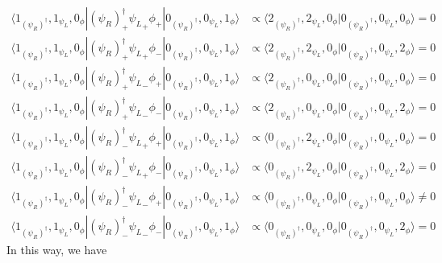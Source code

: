 \begin{align*}
 \langle1_{(\psi_R)^{\dagger}},1_{{\psi_L}},0_{\phi}|(\psi_R)^{\dagger}_{+}{\psi_L}_{+}\phi_{+}|0_{(\psi_R)^{\dagger}},0_{{\psi_L}},1_{\phi}\rangle  &\propto  \langle2_{(\psi_R)^{\dagger}},2_{{\psi_L}},0_{\phi}|0_{(\psi_R)^{\dagger}},0_{{\psi_L}},0_{\phi}\rangle =0\\ 
 \langle1_{(\psi_R)^{\dagger}},1_{{\psi_L}},0_{\phi}|(\psi_R)^{\dagger}_{+}{\psi_L}_{+}\phi_{-}|0_{(\psi_R)^{\dagger}},0_{{\psi_L}},1_{\phi}\rangle  &\propto  \langle2_{(\psi_R)^{\dagger}},2_{{\psi_L}},0_{\phi}|0_{(\psi_R)^{\dagger}},0_{{\psi_L}},2_{\phi}\rangle =0\\ 
 \langle1_{(\psi_R)^{\dagger}},1_{{\psi_L}},0_{\phi}|(\psi_R)^{\dagger}_{+}{\psi_L}_{-}\phi_{+}|0_{(\psi_R)^{\dagger}},0_{{\psi_L}},1_{\phi}\rangle  &\propto  \langle2_{(\psi_R)^{\dagger}},0_{{\psi_L}},0_{\phi}|0_{(\psi_R)^{\dagger}},0_{{\psi_L}},0_{\phi}\rangle =0\\ 
 \langle1_{(\psi_R)^{\dagger}},1_{{\psi_L}},0_{\phi}|(\psi_R)^{\dagger}_{+}{\psi_L}_{-}\phi_{-}|0_{(\psi_R)^{\dagger}},0_{{\psi_L}},1_{\phi}\rangle  &\propto  \langle2_{(\psi_R)^{\dagger}},0_{{\psi_L}},0_{\phi}|0_{(\psi_R)^{\dagger}},0_{{\psi_L}},2_{\phi}\rangle =0\\ 
 \langle1_{(\psi_R)^{\dagger}},1_{{\psi_L}},0_{\phi}|(\psi_R)^{\dagger}_{-}{\psi_L}_{+}\phi_{+}|0_{(\psi_R)^{\dagger}},0_{{\psi_L}},1_{\phi}\rangle  &\propto  \langle0_{(\psi_R)^{\dagger}},2_{{\psi_L}},0_{\phi}|0_{(\psi_R)^{\dagger}},0_{{\psi_L}},0_{\phi}\rangle =0\\ 
 \langle1_{(\psi_R)^{\dagger}},1_{{\psi_L}},0_{\phi}|(\psi_R)^{\dagger}_{-}{\psi_L}_{+}\phi_{-}|0_{(\psi_R)^{\dagger}},0_{{\psi_L}},1_{\phi}\rangle  &\propto  \langle0_{(\psi_R)^{\dagger}},2_{{\psi_L}},0_{\phi}|0_{(\psi_R)^{\dagger}},0_{{\psi_L}},2_{\phi}\rangle =0\\ 
 \langle1_{(\psi_R)^{\dagger}},1_{{\psi_L}},0_{\phi}|(\psi_R)^{\dagger}_{-}{\psi_L}_{-}\phi_{+}|0_{(\psi_R)^{\dagger}},0_{{\psi_L}},1_{\phi}\rangle  &\propto  \langle0_{(\psi_R)^{\dagger}},0_{{\psi_L}},0_{\phi}|0_{(\psi_R)^{\dagger}},0_{{\psi_L}},0_{\phi}\rangle \neq 0\\
 \langle1_{(\psi_R)^{\dagger}},1_{{\psi_L}},0_{\phi}|(\psi_R)^{\dagger}_{-}{\psi_L}_{-}\phi_{-}|0_{(\psi_R)^{\dagger}},0_{{\psi_L}},1_{\phi}\rangle  &\propto  \langle0_{(\psi_R)^{\dagger}},0_{{\psi_L}},0_{\phi}|0_{(\psi_R)^{\dagger}},0_{{\psi_L}},2_{\phi}\rangle =0
\end{align*}
In this way, we have

